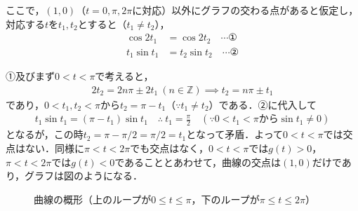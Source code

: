 \documentclass[../main.tex]{subfiles}
\begin{document}
ここで，$(1,0)$（$t=0,\pi,2\pi$に対応）以外にグラフの交わる点があると仮定し，対応する$t$を$t_1,t_2$とすると（$t_1\ne t_2$），
\begin{align*}
  \cos2t_1&=\cos2t_2\quad\cdots①\\
  t_1\sin t_1&=t_2\sin t_2\quad\cdots②
\end{align*}

①及びまず$0<t<\pi$で考えると，
\begin{align*}
  2t_2=2n\pi\pm2t_1\ (n\in\mathbb Z)\implies t_2=n\pi\pm t_1
\end{align*}
であり，$0<t_1,t_2<\pi$から$t_2=\pi-t_1$（$\because t_1\ne t_2$）である．②に代入して
\begin{align*}
  t_1\sin t_1=(\pi-t_1)\sin t_1\quad\therefore\ t_1=\frac\pi2\quad(\because0<t_1<\pi\text{から}\sin t_1\ne0)
\end{align*}
となるが，この時$t_2=\pi-\pi/2=\pi/2=t_1$となって矛盾．よって$0<t<\pi$では交点はない．同様に$\pi<t<2\pi$でも交点はなく，$0<t<\pi$では$g(t)>0$，$\pi<t<2\pi$では$g(t)<0$であることとあわせて，曲線の交点は$(1,0)$だけであり，グラフは図のようになる．

\begin{figure}[htb]
  \centering
  \caption{曲線の概形（上のループが$0\le t\le\pi$，下のループが$\pi\le t\le2\pi$）}
\end{figure}
\end{document}
